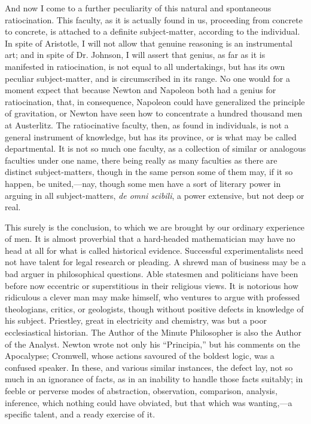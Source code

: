 And now I come to a further peculiarity of this natural and
spontaneous ratiocination. This faculty, as it is actually found in
us, proceeding from concrete to concrete, is attached to a definite
subject-matter, according to the individual. In spite of Aristotle, I
will not allow that genuine reasoning is an instrumental art; and in
spite of Dr. Johnson, I will assert that genius, as far as it is
manifested in ratiocination, is not equal to all undertakings,
but has its own peculiar subject-matter, and is circumscribed in its
range. No one would for a moment expect that because Newton and
Napoleon both had a genius for ratiocination, that, in consequence,
Napoleon could have generalized the principle of gravitation, or
Newton have seen how to concentrate a hundred thousand men at
Austerlitz. The ratiocinative faculty, then, as found in individuals,
is not a general instrument of knowledge, but has its province, or is
what may be called departmental. It is not so much one faculty, as a
collection of similar or analogous faculties under one name, there
being really as many faculties as there are distinct subject-matters,
though in the same person some of them may, if it so happen, be
united,—nay, though some men have a sort of literary power in
arguing in all subject-matters, \emph{de omni scibili}, a power
extensive, but not deep or real.

This surely is the conclusion, to which we are brought by our
ordinary experience of men. It is almost proverbial that a hard-headed
mathematician may have no head at all for what is called historical
evidence. Successful experimentalists need not have talent for legal
research or pleading. A shrewd man of business may be a bad arguer in
philosophical questions. Able statesmen and politicians have been
before now eccentric or superstitious in their religious views. It is
notorious how ridiculous a clever man may make himself, who ventures
to argue with professed theologians, critics, or geologists, though
without positive defects in knowledge of his subject. Priestley, great
in electricity and chemistry, was but a poor ecclesiastical historian.
The Author of the Minute Philosopher is also the Author of the
Analyst. Newton wrote not only his ``Principia,'' but his
comments on the Apocalypse; Cromwell, whose actions savoured of the
boldest logic, was a confused speaker. In these, and various similar
instances, the defect lay, not so much in an ignorance of facts, as in
an inability to handle those facts suitably; in feeble or perverse
modes of abstraction, observation, comparison, analysis, inference,
which nothing could have obviated, but that which was wanting,—a
specific talent, and a ready exercise of it.

